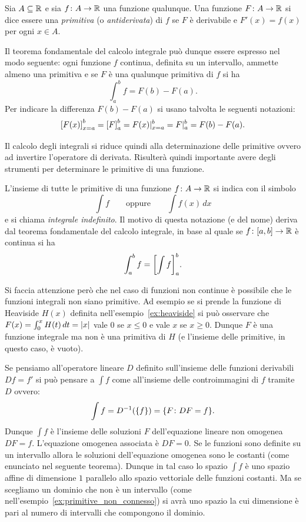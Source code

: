 \begin{definition}[primitiva]
\label{def:primitiva}%
\mymark{***}%
Sia $A \subseteq {\mathbb R}$ e sia $f\colon A \to {\mathbb R}$ una funzione qualunque.
Una funzione $F\colon A \to {\mathbb R}$ si dice essere una \emph{primitiva}%
%
(o \emph{antiderivata})
di $f$ se $F$ è derivabile e $F'(x)=f(x)$ per ogni $x\in A$.
\end{definition}

Il teorema fondamentale del calcolo integrale può dunque essere espresso nel
modo seguente: ogni funzione $f$ continua, definita su un intervallo,
ammette almeno una primitiva e se $F$ è una qualunque primitiva di $f$ si ha
\[
  \int_a^b f = F(b) - F(a).
\]
Per indicare la differenza $F(b)-F(a)$ si usano
talvolta le seguenti notazioni:
\[
  {\left[ F(x) \right]}_{x=a}^b = {\left[ F \right]}_a^b
  = F(x) \vert_{x=a}^b
  = F \vert_a^b = F(b) - F(a).
\]

Il calcolo degli integrali si riduce quindi alla determinazione delle primitive
ovvero ad invertire l'operatore di derivata.
Risulterà quindi importante avere degli strumenti per determinare le primitive
di una funzione.

\begin{definition}
\mymark{***}
L'insieme di tutte le primitive di una funzione $f\colon A \to {\mathbb R}$
si indica con il simbolo
\[
  \int f
  \qquad\text{oppure}\qquad
  \int f(x) \, dx
\]
e si chiama \emph{integrale indefinito}.
Il motivo di questa notazione (e del nome) deriva dal teorema fondamentale del
calcolo integrale, in
base al quale se $f\colon[a,b]\to {\mathbb R}$
è continua si ha
\[
  \int_a^b f = {\left[ \int f \right]}_a^b.
\]
\end{definition}

\begin{remark}
Si faccia attenzione però che nel caso di funzioni non continue è possibile
che le funzioni integrali non siano primitive. Ad esempio
se si prende la funzione di Heaviside $H(x)$ definita nell'esempio~\ref{ex:heaviside}
si può osservare che $F(x)=\int_0^x H(t)\, dt = {\left|x\right|}$
vale $0$ se $x \le 0$ e vale $x$ se $x \ge 0$.
Dunque $F$ è una funzione integrale ma non è una primitiva di $H$
(e l'insieme delle primitive, in questo caso, è vuoto).
\end{remark}

Se pensiamo all'operatore lineare $D$ definito sull'insieme delle funzioni
derivabili $Df = f'$
si può pensare a $\int f$ come all'insieme delle controimmagini di $f$
tramite $D$ ovvero:
\[
  \int f = D^{-1}({\left\{ f \right\}}) = {\left\{ F \colon DF =f  \right\}}.
\]
Dunque $\int f$ è l'insieme delle soluzioni $F$ dell'equazione lineare
non omogenea $DF =f$. L'equazione omogenea associata è $DF = 0$.
Se le funzioni sono definite su un intervallo allora le soluzioni dell'equazione omogenea sono le costanti (come enunciato nel seguente teorema).
Dunque in tal caso lo spazio $\int f$ è uno spazio affine di dimensione $1$
parallelo allo spazio vettoriale delle funzioni costanti. 
Ma se scegliamo un dominio che non è un intervallo 
(come nell'esempio~\ref{ex:primitive_non_connesso}) 
si avrà uno spazio la cui dimensione è pari al numero di intervalli che compongono il dominio.

